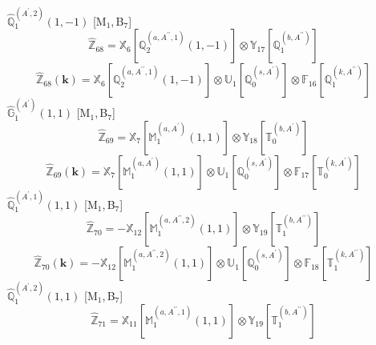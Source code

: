 \documentclass[fleqn,10pt,landscape]{article}
\begin{document}
\begin{itemize}
\begin{dmath*}
\end{dmath*}
\vspace{4mm}
\noindent {} $\,\,\,\hat{\mathbb{Q}}_{1}^{(A^{\prime},2)}(1,-1)$ [M$_{1}$,\,B$_{7}$]
\begin{dmath*}
\hat{\mathbb{Z}}_{68}=\mathbb{X}_{6}[\mathbb{Q}_{2}^{(a,A^{\prime\prime},1)}(1,-1)] \otimes\mathbb{Y}_{17}[\mathbb{Q}_{1}^{(b,A^{\prime\prime})}]
\end{dmath*}
\begin{dmath*}
\hat{\mathbb{Z}}_{68}(\bm{k})=\mathbb{X}_{6}[\mathbb{Q}_{2}^{(a,A^{\prime\prime},1)}(1,-1)] \otimes\mathbb{U}_{1}[\mathbb{Q}_{0}^{(s,A^{\prime})}] \otimes\mathbb{F}_{16}[\mathbb{Q}_{1}^{(k,A^{\prime\prime})}]
\end{dmath*}
\vspace{4mm}
\noindent {} $\,\,\,\hat{\mathbb{G}}_{1}^{(A^{\prime})}(1,1)$ [M$_{1}$,\,B$_{7}$]
\begin{dmath*}
\hat{\mathbb{Z}}_{69}=\mathbb{X}_{7}[\mathbb{M}_{1}^{(a,A^{\prime})}(1,1)] \otimes\mathbb{Y}_{18}[\mathbb{T}_{0}^{(b,A^{\prime})}]
\end{dmath*}
\begin{dmath*}
\hat{\mathbb{Z}}_{69}(\bm{k})=\mathbb{X}_{7}[\mathbb{M}_{1}^{(a,A^{\prime})}(1,1)] \otimes\mathbb{U}_{1}[\mathbb{Q}_{0}^{(s,A^{\prime})}] \otimes\mathbb{F}_{17}[\mathbb{T}_{0}^{(k,A^{\prime})}]
\end{dmath*}
\vspace{4mm}
\noindent {} $\,\,\,\hat{\mathbb{Q}}_{1}^{(A^{\prime},1)}(1,1)$ [M$_{1}$,\,B$_{7}$]
\begin{dmath*}
\hat{\mathbb{Z}}_{70}=- \mathbb{X}_{12}[\mathbb{M}_{1}^{(a,A^{\prime\prime},2)}(1,1)] \otimes\mathbb{Y}_{19}[\mathbb{T}_{1}^{(b,A^{\prime\prime})}]
\end{dmath*}
\begin{dmath*}
\hat{\mathbb{Z}}_{70}(\bm{k})=- \mathbb{X}_{12}[\mathbb{M}_{1}^{(a,A^{\prime\prime},2)}(1,1)] \otimes\mathbb{U}_{1}[\mathbb{Q}_{0}^{(s,A^{\prime})}] \otimes\mathbb{F}_{18}[\mathbb{T}_{1}^{(k,A^{\prime\prime})}]
\end{dmath*}
\vspace{4mm}
\noindent {} $\,\,\,\hat{\mathbb{Q}}_{1}^{(A^{\prime},2)}(1,1)$ [M$_{1}$,\,B$_{7}$]
\begin{dmath*}
\hat{\mathbb{Z}}_{71}=\mathbb{X}_{11}[\mathbb{M}_{1}^{(a,A^{\prime\prime},1)}(1,1)] \otimes\mathbb{Y}_{19}[\mathbb{T}_{1}^{(b,A^{\prime\prime})}]
\end{dmath*}
\begin{dmath*}

\end{dmath*}
\end{itemize}
\end{document}
